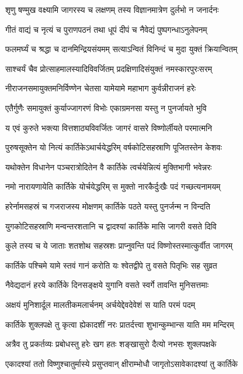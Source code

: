 \twolineshloka
{शृणु षण्मुख वक्ष्यामि जागरस्य च लक्षणम्}
{तस्य विज्ञानमात्रेण दुर्लभो न जनार्दनः} %

\twolineshloka
{गीतं वाद्यं च नृत्यं च पुराणपठनं तथा}
{धूपं दीपं च नैवेद्यं पुष्पगन्धाऽनुलेपनम्} %

\twolineshloka
{फलमर्घ्यं च श्रद्धा च दानमिन्द्रियसंयमम्}
{सत्याऽन्वितं विनिन्दं च मुदा युक्तं क्रियान्वितम्} %

\twolineshloka
{साश्चर्यं चैव प्रोत्साहमालस्यादिविवर्जितम्}
{प्रदक्षिणादिसंयुक्तं नमस्कारपुरःसरम्} %

\twolineshloka
{नीराजनसमायुक्तमनिर्विण्णेन चेतसा}
{यामेयामे महाभाग कुर्वन्नीराजनं हरेः} %

\twolineshloka
{एतैर्गुणैः समायुक्तं कुर्याज्जागरणं विभोः}
{एकाग्रमनसा यस्तु न पुनर्जायते भुवि} %

\twolineshloka
{य एवं कुरुते भक्त्या वित्तशाठ्यविवर्जितः}
{जागरं वासरे विष्णोर्लीयते परमात्मनि} %

\twolineshloka
{पुरुषसूक्तेन यो नित्यं कार्तिकेऽथार्चयेद्धरिम्}
{वर्षकोटिसहस्राणि पूजितस्तेन केशवः} %

\twolineshloka
{यथोक्तेन विधानेन पञ्चरात्रोदितेन वै}
{कार्तिके त्वर्चयेन्नित्यं मुक्तिभागी भवेन्नरः} %

\twolineshloka
{नमो नारायणायेति कार्तिके योर्चयेद्धरिम्}
{स मुक्तो नारकैर्दुःखैः पदं गच्छत्यनामयम्} %

\twolineshloka
{हरेर्नामसहस्रं च गजराजस्य मोक्षणम्}
{कार्तिके पठते यस्तु पुनर्जन्म न विन्दति} %

\twolineshloka
{युगकोटिसहस्राणि मन्वन्तरशतानि च}
{द्वादश्यां कार्तिके मासि जागरी वसते दिवि} %

\twolineshloka
{कुले तस्य च ये जाताः शतशोथ सहस्रशः}
{प्राप्नुवन्ति पदं विष्णोस्तस्मात्कुर्वीत जागरम्} %

\twolineshloka
{कार्तिके पश्चिमे यामे स्तवं गानं करोति यः}
{श्वेतद्वीपे तु वसते पितृभिः सह सुव्रत} %

\twolineshloka
{नैवेद्यदानं हरये कार्तिके दिनसङ्क्षये}
{युगानि वसते स्वर्गे तावन्ति मुनिसत्तमाः} %

\twolineshloka
{अक्षयं मुनिशार्दूल मालतीकमलार्चनम्}
{अर्चयेद्देवदेवेशं स याति परमं पदम्} %

\twolineshloka
{कार्तिके शुक्लपक्षे तु कृत्वा ह्येकादशीं नरः}
{प्रातर्दत्त्वा शुभान्कुम्भान्स याति मम मन्दिरम्} %

\twolineshloka
{अत्रैव तु प्रकर्तव्यः प्रबोधस्तु हरेः खग}
{हतः शङ्खासुरो दैत्यो नभसः शुक्लपक्षके} %

\twolineshloka
{एकादश्यां ततो विष्णुश्चातुर्मास्ये प्रसुप्तवान्}
{क्षीराम्भोधौ जागृतोऽसावेकादश्यां तु कार्तिके} %

